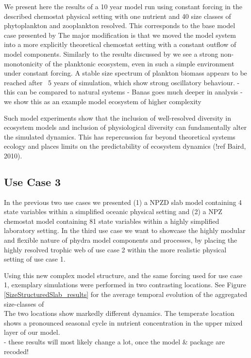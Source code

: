 \documentclass[template.tex]{subfiles}
\begin{document}

We present here the results of a 10 year model run using constant forcing in the described chemostat physical setting with one nutrient and 40 size classes of phytoplankton and zooplankton resolved. This corresponds to the base model case presented by \cite{Banas2011b} The major modification is that we moved the model system into a more explicitly theoretical chemostat setting with a constant outflow of model components. Similarly to the results discussed by \cite{Banas2011b} we see a strong non-monotonicity of the planktonic ecosystem, even in such a simple environment under constant forcing. A stable size spectrum of plankton biomass appears to be reached after ~5 years of simulation, which show strong oscillatory behaviour. 
- this can be compared to natural systems
- Banas goes much deeper in analysis
- we show this as an example model ecosystem of higher complexity

Such model experiments show that the inclusion of well-resolved diversity in ecosystem models and inclusion of physiological diversity can fundamentally alter the simulated dynamics. This has repercussion far beyond theoretical systems ecology and places limits on the predictability of ecosystem dynamics (!ref Baird, 2010).


\subsection{Use Case 3}
In the previous two use cases we presented (1) a NPZD slab model containing 4 state variables within a simplified oceanic physical setting and (2) a NPZ chemostat model containing 81 state variables within a highly simplified laboratory setting. 
In the third use case we want to showcase the highly modular and flexible nature of phydra model components and processes, by placing the highly resolved trophic web of use case 2 within the more realistic physical setting of use case 1.

Using this new complex model structure, and the same forcing used for use case 1, exemplary simulations were performed in two contrasting locations. 
See Figure \ref{SizeStructuredSlab_results} for the average temporal evolution of the aggregated size-classes of \\

The two locations show markedly different dynamics. The temperate location shows a pronounced seasonal cycle in nutrient concentration in the upper mixed layer of our model. \\

- these results will most likely change a lot, once the model & package are recoded!\\


\clearpage

\biblio
\end{document}
